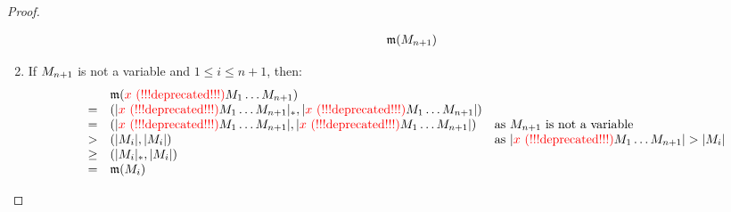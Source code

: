 \begin{proof}
\begin{enumerate}
\begin{enumerate}
\[\begin{array}{rcll}
        \mathfrak{m}(M_{n+1})
      \end{array}
    \]
  \end{enumerate}
\item
  If $M_{n+1}$ is not a variable
  and $1 \leq i \leq n + 1$, then:
  \[
    \begin{array}{rcll}
    &&
      \mathfrak{m}(\textcolor{red}{x \text{\,\,(!!!deprecated!!!)}}M_1\hdots M_{n+1})
    \\
    & = &
      (\lvert\textcolor{red}{x \text{\,\,(!!!deprecated!!!)}}M_1\hdots M_{n+1}\rvert_*, \lvert\textcolor{red}{x \text{\,\,(!!!deprecated!!!)}}M_1\hdots M_{n+1}\rvert)
    \\
    & = &
      (\lvert\textcolor{red}{x \text{\,\,(!!!deprecated!!!)}}M_1\hdots M_{n+1}\rvert, \lvert\textcolor{red}{x \text{\,\,(!!!deprecated!!!)}}M_1\hdots M_{n+1}\rvert)
      & \text{as $M_{n+1}$ is not a variable}
    \\
    & > &
      (\lvert M_i\rvert, \lvert M_i\rvert)
      & \text{as $\lvert\textcolor{red}{x \text{\,\,(!!!deprecated!!!)}}M_1\hdots M_{n+1}\rvert > \lvert M_i\rvert$}
    \\
    & \geq &
      (\lvert M_i\rvert_*, \lvert M_i\rvert)
    \\
    & = &
      \mathfrak{m}(M_i)
    \end{array}
  \]
\end{enumerate}
\end{proof}

